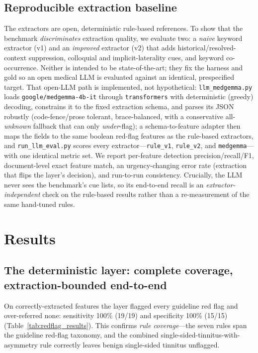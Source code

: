 \documentclass[11pt]{article}
\begin{document}
\subsection{Reproducible extraction baseline}
The extractors are open, deterministic rule-based references. To show that the benchmark \emph{discriminates} extraction quality, we evaluate two: a \emph{naive} keyword extractor (v1) and an \emph{improved} extractor (v2) that adds historical/resolved-context suppression, colloquial and implicit-laterality cues, and keyword co-occurrence. Neither is intended to be state-of-the-art; they fix the harness and gold so an open medical LLM is evaluated against an identical, prespecified target. That open-LLM path is implemented, not hypothetical: \texttt{llm\_medgemma.py} loads \texttt{google/medgemma-4b-it} through \texttt{transformers} with deterministic (greedy) decoding, constrains it to the fixed extraction schema, and parses its JSON robustly (code-fence/prose tolerant, brace-balanced, with a conservative all-\emph{unknown} fallback that can only \emph{under}-flag); a schema-to-feature adapter then maps the fields to the same boolean red-flag features as the rule-based extractors, and \texttt{run\_llm\_eval.py} scores every extractor---\texttt{rule\_v1}, \texttt{rule\_v2}, and \texttt{medgemma}---with one identical metric set. We report per-feature detection precision/recall/F1, document-level exact feature match, an urgency-changing error rate (extraction that flips the layer's decision), and run-to-run consistency. Crucially, the LLM never sees the benchmark's cue lists, so its end-to-end recall is an \emph{extractor-independent} check on the rule-based results rather than a re-measurement of the same hand-tuned rules.

\section{Results}
\subsection{The deterministic layer: complete coverage, extraction-bounded end-to-end}
On correctly-extracted features the layer flagged every guideline red flag and over-referred none: sensitivity 100\% (19/19) and specificity 100\% (15/15) (Table~\ref{tab:redflag_results}). This confirms \emph{rule coverage}---the seven rules span the guideline red-flag taxonomy, and the combined single-sided-tinnitus-with-asymmetry rule correctly leaves benign single-sided tinnitus unflagged.
\end{document}
